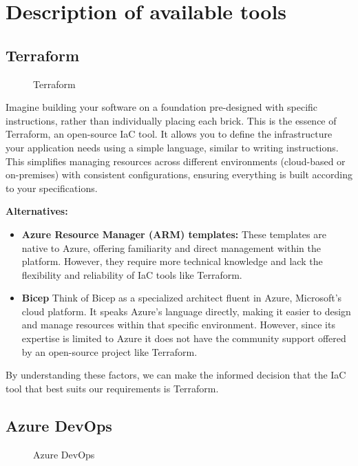\section{Description of available tools}

\subsection{Terraform}

\begin{figure}[H]
    \centering
    \caption{Terraform}
    \label{fig:terraform}
\end{figure}

Imagine building your software on a foundation pre-designed with specific instructions, rather than individually placing each brick. This is the essence of Terraform, an open-source IaC tool. It allows you to define the infrastructure your application needs using a simple language, similar to writing instructions. This simplifies managing resources across different environments (cloud-based or on-premises) with consistent configurations, ensuring everything is built according to your specifications.
\par
\textbf{Alternatives:}
\begin{itemize}
    \item \textbf{Azure Resource Manager (ARM) templates:} These templates are native to Azure, offering familiarity and direct management within the platform. However, they require more technical knowledge and lack the flexibility and reliability of IaC tools like Terraform.
    \item \textbf{Bicep} Think of Bicep as a specialized architect fluent in Azure, Microsoft's cloud platform. It speaks Azure's language directly, making it easier to design and manage resources within that specific environment. However, since its expertise is limited to Azure it does not have the community support offered by an open-source project like Terraform.
\end{itemize}
By understanding these factors, we can make the informed decision that the IaC tool that best suits our requirements is Terraform.
\subsection{Azure DevOps}

\begin{figure}[H]
    \centering
    \caption{Azure DevOps}
    \label{fig:Azure_DevOps}
\end{figure}

